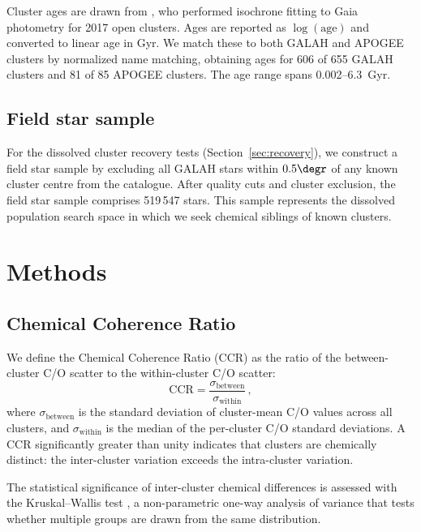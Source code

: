 \documentclass[fleqn,usenatbib]{mnras}
\newcommand{\co}{C/O\xspace}
\begin{document}
Cluster ages are drawn from \citet{CantatGaudin2020}, who performed isochrone fitting to Gaia photometry for 2017 open clusters.
Ages are reported as $\log(\mathrm{age})$ and converted to linear age in Gyr.
We match these to both GALAH and APOGEE clusters by normalized name matching, obtaining ages for 606 of 655 GALAH clusters and 81 of 85 APOGEE clusters.
The age range spans 0.002--6.3~Gyr.

\subsection{Field star sample}
\label{sec:field}

For the dissolved cluster recovery tests (Section~\ref{sec:recovery}), we construct a field star sample by excluding all GALAH stars within $0.5\degr$ of any known cluster centre from the \citet{CantatGaudin2020} catalogue.
After quality cuts and cluster exclusion, the field star sample comprises 519\,547 stars.
This sample represents the dissolved population search space in which we seek chemical siblings of known clusters.


\section{Methods}
\label{sec:methods}

\subsection{Chemical Coherence Ratio}
\label{sec:ccr}

We define the Chemical Coherence Ratio (CCR) as the ratio of the between-cluster \co scatter to the within-cluster \co scatter:
\begin{equation}
\mathrm{CCR} = \frac{\sigma_{\mathrm{between}}}{\sigma_{\mathrm{within}}} \,,
\label{eq:ccr}
\end{equation}
where $\sigma_{\mathrm{between}}$ is the standard deviation of cluster-mean \co values across all clusters, and $\sigma_{\mathrm{within}}$ is the median of the per-cluster \co standard deviations.
A CCR significantly greater than unity indicates that clusters are chemically distinct: the inter-cluster variation exceeds the intra-cluster variation.

The statistical significance of inter-cluster chemical differences is assessed with the Kruskal--Wallis test \citep{Kruskal1952}, a non-parametric one-way analysis of variance that tests whether multiple groups are drawn from the same distribution.
\end{document}
